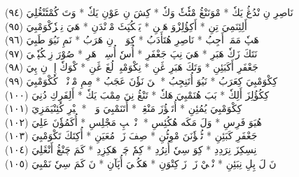\documentclass[a4paper, 10pt]{report}
\begin{document}
\begin{center}
\textarabic{(٩٤) \textcolor{mygreen}{نَاصِرِ نِ نْدُڠُ يَكٗ  * مْوَنَنْڠُ مْٹٗٹٗ وَكٗ  * كِشَ نِ عَوْنِ يَكٗ  * وَتَ كُمْٹَنْڠُلِيَ }} 
\\[5mm] 

\textarabic{(٩٥) \textcolor{mygreen}{أَلِئِنَمِيَ تِنِ  * أَكِؤُلِزْوَ هَنٖنِ  * يَمٖكُپَٹَ مْوٖنْدَنِ  * هَيَ نِمٖزٗكْوَمْبِيَ }} 
\\[5mm] 

\textarabic{(٩٦) \textcolor{mygreen}{هَپٗ مَمَكٖ أَجِبُ  * نَاصِرِ هُتَأَدَبُ  * كِوَ وٖوٖ نِ هَرَبُ  * نَمِ نَيُوَ طَبِيَ }} 
\\[5mm] 

\textarabic{(٩٧) \textcolor{mygreen}{نَتَكَ زَكٗ هَبَرِ  * هَيَ نِپَ جَعْفَرِ  * أُسٗ أُسِمٖمٖ هَرِ  * صُوْرَ زِمٖكُپٗتٖيَ }} 
\\[5mm] 

\textarabic{(٩٨) \textcolor{mygreen}{جَعْفَرِ أَكَبَئِنِ  * وَتَكَ هَبَرِ ڠَنِ  * نِكْوَمْبِيٖ لُغَ ڠَنِ  * كْوَكٗ إِوٖ نِ پِيَ }} 
\\[5mm] 

\textarabic{(٩٩) \textcolor{mygreen}{كِكْوَمْبِيَ كِعَرَبُ  * نَيُوَ أُتَنِجِبُ  * تٖنَ نَؤٗنَ عَجَبُ  * مِمِ مْوٖنْيٖوٖ كُكْوَمْبِيَ }} 
\\[5mm] 

\textarabic{(١٠٠) \textcolor{mygreen}{كِكُؤُلِزَ أَلِكٗ  * بَبَ هُنَمْبِيَ هَكٗ  * تَنْڠُ نِنَ مِمْبَ يَكٗ  * أَلِفَرِكِ دُنِيَ }} 
\\[5mm] 

\textarabic{(١٠١) \textcolor{mygreen}{كِكْوَمْبِيَ يُمُئِنِ  * أُتَڠٖؤُزَ مَنْڠِنٖ  * أُتَنَمْبِيَ وَفٖنٖ  * خٖيْرِ كُئِنْيَمَزِيَ }} 
\\[5mm] 

\textarabic{(١٠٢) \textcolor{mygreen}{وٖوٖ هُيَوَ فَرِسِ  * وَلَ مَكَه هُكُئِسِ  * وٖنْدٖلٖپِ مَجْلِسِ  * أُكَمُؤٗنَ عَلِيَ }} 
\\[5mm] 

\textarabic{(١٠٣) \textcolor{mygreen}{جَعْفَرِ كَبَئِنِ  * ٹُمٖؤٗنَنَ مْوِٹُنِ  * صِفَ زَكٖ مُعَيَنِ  * أُكِتَكَ تَكْوَمْبِيَ }} 
\\[5mm] 

\textarabic{(١٠٤) \textcolor{mygreen}{نِسِكِزَ نِرَدِدِ  * كِوَ سِيٗ أُنِرُدِ  * كِمٗ چَكٖ هَكِزِدِ  * كَمَ چَنْڠُ أَنْڠَلِيَ }} 
\\[5mm] 

\textarabic{(١٠٥) \textcolor{mygreen}{نَ لَ پِلِ نِبَئِنِ  * نْيٖيْ زَكٖ زَ كِتْوَنِ  * هَكُمٖيَ أُپَآنِ  * نَ كَمَ سِيٗ نَمْبِيَ }} 
\\[5mm] 


\end{center}
\end{document}
